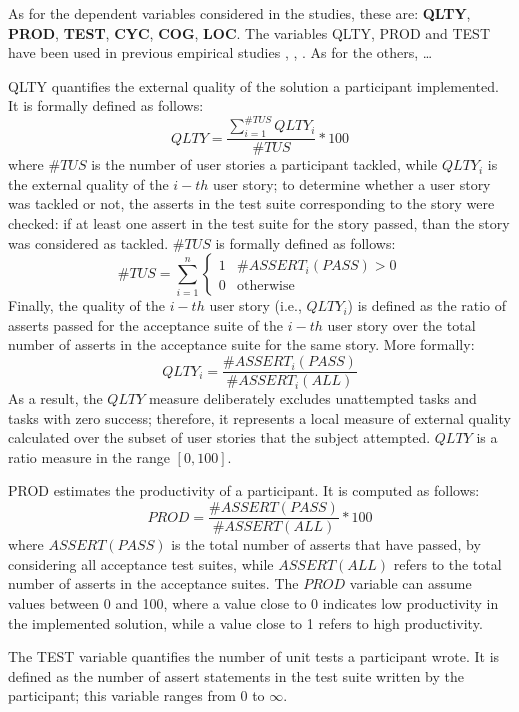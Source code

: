 As for the dependent variables considered in the studies, these are: \textbf{QLTY}, \textbf{PROD}, \textbf{TEST}, \textbf{CYC}, \textbf{COG}, \textbf{LOC}.
The variables QLTY, PROD and TEST have been used in previous empirical studies \cite{DBLP:journals/tse/ErdogmusMT05}, \cite{DBLP:journals/tse/FucciETOJ17}, \cite{DBLP:journals/ese/TosunDFVTESOTJJ17}. As for the others, \dots

QLTY quantifies the external quality of the solution a participant implemented. It is formally defined as follows: 
\[
    QLTY = \frac{\sum_{i=1}^{\#TUS} QLTY_i}{\#TUS} * 100 
\]
where $\#TUS$ is the number of user stories a participant tackled, while $QLTY_i$ is the external quality of the $i-th$ user story; to determine whether a user story was tackled or not, the asserts in the test suite corresponding to the story were checked: if at least one assert in the test suite for the story passed, than the story was considered as tackled. $\#TUS$ is formally defined as follows:
\[
    \#TUS = \sum_{i=1}^{n} 
        \begin{cases}
            1 & \text{$\#ASSERT_i(PASS) > 0$}\\
                0 & \text{otherwise}
        \end{cases}
\]
Finally, the quality of the $i-th$ user story (i.e., $QLTY_i$) is defined as the ratio of asserts passed for the acceptance suite of the $i-th$ user story over the total number of asserts in the acceptance suite for the same story. More formally:
\[
    QLTY_i = \frac{\#ASSERT_i(PASS)}{\#ASSERT_i(ALL)}
\]
As a result, the $QLTY$ measure deliberately excludes unattempted tasks and tasks with zero success; therefore, it represents a local measure of external quality calculated over the subset of user stories that the subject attempted. $QLTY$ is a ratio measure in the range $[0, 100]$.

PROD estimates the productivity of a participant. It is computed as follows:
\[
    PROD = \frac{\#ASSERT(PASS)}{\#ASSERT(ALL)} * 100
\]
where $ASSERT(PASS)$ is the total number of asserts that have passed, by considering all acceptance test suites, while $ASSERT(ALL)$ refers to the total number of asserts in the acceptance suites. The $PROD$ variable can assume values between 0 and 100, where a value close to 0 indicates low productivity in the implemented solution, while a value close to 1 refers to high productivity.

The TEST variable quantifies the number of unit tests a participant wrote. It is defined as the number of assert statements in the test suite written by the participant; this variable ranges from 0 to $\infty$.


